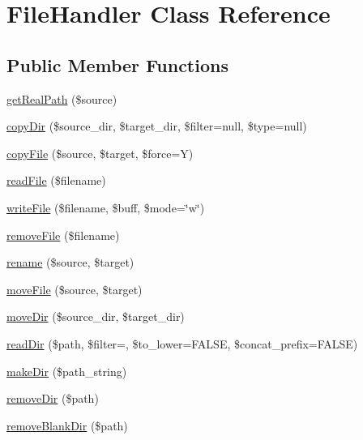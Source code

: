\hypertarget{classFileHandler}{}\section{File\+Handler Class Reference}
\label{classFileHandler}
\subsection*{Public Member Functions}
\begin{DoxyCompactItemize}
\item 
\hyperlink{classFileHandler_a6370b3eeddb705be04d9f60902a746e0}{get\+Real\+Path} (\$source)
\item 
\hyperlink{classFileHandler_a01289213af2a57f07018e7a84c8b9e87}{copy\+Dir} (\$source\+\_\+dir, \$target\+\_\+dir, \$filter=null, \$type=null)
\item 
\hyperlink{classFileHandler_a7baa5c27d1a51956f3abaa91fb906936}{copy\+File} (\$source, \$target, \$force=\textquotesingle{}Y\textquotesingle{})
\item 
\hyperlink{classFileHandler_ac0bd2431461ad2bc04c093bfbb826bea}{read\+File} (\$filename)
\item 
\hyperlink{classFileHandler_ad90c10a81460f437bc68952427606155}{write\+File} (\$filename, \$buff, \$mode=\char`\"{}w\char`\"{})
\item 
\hyperlink{classFileHandler_aa5969f9fe0ce869fc736c4da384959e9}{remove\+File} (\$filename)
\item 
\hyperlink{classFileHandler_abfeaad5fe3c937fdbfed73f2138b3d48}{rename} (\$source, \$target)
\item 
\hyperlink{classFileHandler_aa558697af5a900f8594e1013f8d8b2c8}{move\+File} (\$source, \$target)
\item 
\hyperlink{classFileHandler_acb0c863aeb4f29a5ee89eb8f47d576ca}{move\+Dir} (\$source\+\_\+dir, \$target\+\_\+dir)
\item 
\hyperlink{classFileHandler_a4343793c7ee528f02a2af74da35b93d1}{read\+Dir} (\$path, \$filter=\textquotesingle{}\textquotesingle{}, \$to\+\_\+lower=F\+A\+L\+SE, \$concat\+\_\+prefix=F\+A\+L\+SE)
\item 
\hyperlink{classFileHandler_a9c2502d10c34a3996f1d6927624a7824}{make\+Dir} (\$path\+\_\+string)
\item 
\hyperlink{classFileHandler_a55015d030d3773d96281b0fa4bda986e}{remove\+Dir} (\$path)
\item 
\hyperlink{classFileHandler_a538bfd50008250786985c7da4ff768f1}{remove\+Blank\+Dir} (\$path)

\end{DoxyCompactItemize}
